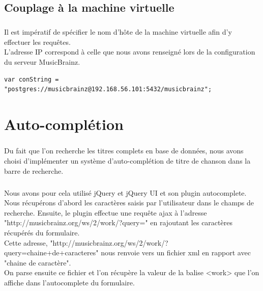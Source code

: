 \documentclass{report}
\begin{document}
	\section*{Couplage à la machine virtuelle}

		\paragraph{}{
		Il est impératif de spécifier le nom d'hôte de la machine virtuelle afin d'y effectuer les requêtes.\\
		L'adresse IP correspond à celle que nous avons renseigné lors de la configuration du serveur MusicBrainz.
\begin{lstlisting}
var conString = "postgres://musicbrainz@192.168.56.101:5432/musicbrainz";
\end{lstlisting}
		}



%
\chapter*{Auto-complétion}
\thispagestyle{fancy}
	\paragraph{}{
		Du fait que l'on recherche les titres complets en base de données, nous avons choisi d'implémenter un système d’auto-complétion de titre de chanson dans la barre de recherche.
	}
	
	\paragraph{}{
		Nous avons pour cela utilisé jQuery et jQuery UI et son plugin autocomplete. \\
		Nous récupérons d'abord les caractères saisis par l'utilisateur dans le champs de recherche. Ensuite, le plugin effectue une requête ajax à l'adresse "http://musicbrainz.org/ws/2/work/?query=" en rajoutant les caractères récupérés du formulaire. \\
		Cette adresse, "http://musicbrainz.org/ws/2/work/?query=chaine+de+caracteres" nous renvoie vers un fichier xml en rapport avec "chaine de caractère". \\
		
		On parse ensuite ce fichier et l'on récupère la valeur de la balise <work> que l'on affiche dans l'autocomplete du formulaire.
	}
\end{document}
